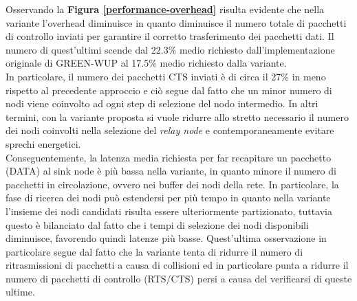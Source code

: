\documentclass[binding=0.6cm,TFA]{sapthesis}
\begin{document}
Osservando la \textbf{Figura \ref{performance-overhead}} risulta evidente che nella variante l'overhead diminuisce in quanto diminuisce il numero totale di pacchetti di
controllo inviati per garantire il corretto trasferimento dei pacchetti dati. Il numero di quest'ultimi scende dal 22.3\% medio richiesto
dall'implementazione originale di GREEN-WUP al 17.5\% medio richiesto dalla variante.\\

In particolare, il numero dei pacchetti CTS inviati è di circa il 27\% in meno rispetto al precedente approccio e ciò segue dal fatto che un minor
numero di nodi viene coinvolto ad ogni step di selezione del nodo intermedio. In altri termini, con la variante proposta si vuole ridurre allo stretto
necessario il numero dei nodi coinvolti nella selezione del \emph{relay node} e contemporaneamente evitare sprechi energetici.\\

Conseguentemente, la latenza media richiesta per far recapitare un pacchetto (DATA) al sink node è più bassa nella variante, in quanto minore il
numero di pacchetti in circolazione, ovvero nei buffer dei nodi della rete. In particolare, la fase di ricerca dei nodi può estendersi per più tempo
in quanto nella variante l'insieme dei nodi candidati risulta essere ulteriormente partizionato, tuttavia questo è bilanciato dal fatto che i tempi
di selezione dei nodi disponibili diminuisce, favorendo quindi latenze più basse. Quest'ultima osservazione in particolare segue dal fatto che la variante
tenta di ridurre il numero di ritrasmissioni di pacchetti a causa di collisioni ed in particolare punta a ridurre il numero di pacchetti di controllo
(RTS/CTS) persi a causa del verificarsi di queste ultime.\\
\end{document}
